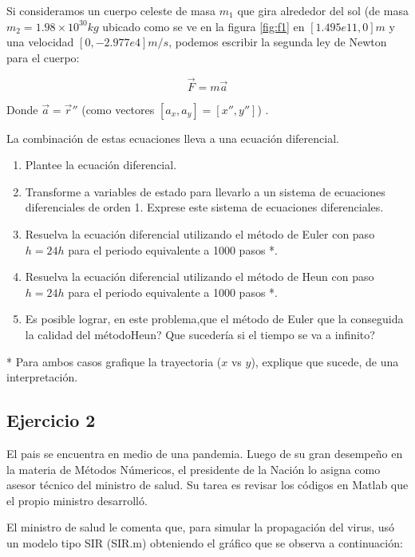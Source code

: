 \documentclass[a4paper,11pt]{article}
\theoremstyle{mytheor}
\begin{document}
Si consideramos un cuerpo celeste de masa $m_1$ que gira alrededor del sol (de masa $m_2 = 1.98\times10^{30}kg$ ubicado como se ve en la figura \ref{fig:f1} en $[1.495e11 , 0]m$  y una velocidad $[0 ,-2.977e4]m/s$, podemos escribir la segunda ley de Newton para el cuerpo:

\begin{equation*}
\vec F = m \vec a
\end{equation*}

Donde $\vec a =\vec r''$ (como vectores $[a_x,a_y]= [x'',y'']$) .


La combinación de estas ecuaciones lleva a una ecuación diferencial.
\begin{enumerate}
\item Plantee la ecuación diferencial. 
\item Transforme a variables de estado para llevarlo a un sistema de ecuaciones diferenciales de orden 1. Exprese este sistema de ecuaciones diferenciales.
\item Resuelva la ecuación diferencial utilizando el método de Euler con paso $h= 24h$ para el periodo equivalente a 1000 pasos *.
\item Resuelva la ecuación diferencial utilizando el método de Heun con paso $h= 24h$ para el periodo equivalente a 1000 pasos *.
\item Es posible lograr, en este problema,que el método de Euler que la conseguida la calidad del métodoHeun? Que sucedería si el tiempo se va a infinito?
\end{enumerate}

* Para ambos casos grafique la trayectoria ($x$ vs $y$), explique que sucede, de una interpretación.

\subsection*{Ejercicio 2}

El pais se encuentra en medio de una pandemia. Luego de su gran desempeño en la materia de Métodos Númericos, el presidente de la Nación lo asigna como asesor técnico del ministro de salud. Su tarea es revisar los códigos en Matlab que el propio ministro desarrolló.

El ministro de salud le comenta que, para simular la propagación del virus, usó un modelo tipo SIR (SIR.m) obteniendo el gráfico que se observa a continuación:
\end{document}
